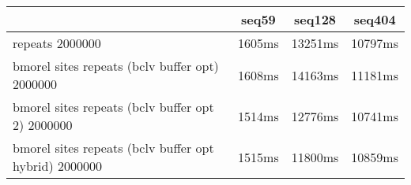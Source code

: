 \begin{tabular}{|l|c|c|c|}
\hline
 & seq59 & seq128 & seq404  \\
\hline
repeats 2000000 &  1605ms &  13251ms &  10797ms\\
\hline
bmorel sites repeats (bclv buffer opt) 2000000 &  1608ms &  14163ms &  11181ms\\
\hline
bmorel sites repeats (bclv buffer opt 2) 2000000 &  1514ms &  12776ms &  10741ms\\
\hline
bmorel sites repeats (bclv buffer opt hybrid) 2000000 &  1515ms &  11800ms &  10859ms\\
\hline
\end{tabular}
